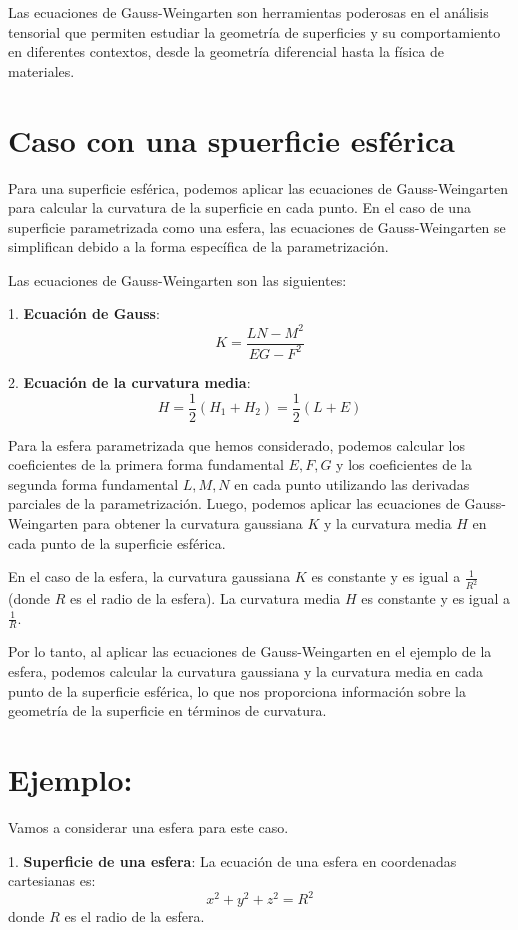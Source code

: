 \documentclass{article}
\begin{document}
	Las ecuaciones de Gauss-Weingarten son herramientas poderosas en el análisis tensorial que permiten estudiar la geometría de superficies y su comportamiento en diferentes contextos, desde la geometría diferencial hasta la física de materiales.
	
	\section{Caso con una spuerficie esférica}
	
	Para una superficie esférica, podemos aplicar las ecuaciones de Gauss-Weingarten para calcular la curvatura de la superficie en cada punto. En el caso de una superficie parametrizada como una esfera, las ecuaciones de Gauss-Weingarten se simplifican debido a la forma específica de la parametrización.
	
	Las ecuaciones de Gauss-Weingarten son las siguientes:
	
	1. \textbf{Ecuación de Gauss}:
	$$ K = \frac{LN - M^2}{EG - F^2} $$
	
	2. \textbf{Ecuación de la curvatura media}:
	$$ H = \frac{1}{2}(H_1 + H_2) = \frac{1}{2}(L + E) $$
	
	Para la esfera parametrizada que hemos considerado, podemos calcular los coeficientes de la primera forma fundamental $ E, F, G $ y los coeficientes de la segunda forma fundamental $ L, M, N $ en cada punto utilizando las derivadas parciales de la parametrización. Luego, podemos aplicar las ecuaciones de Gauss-Weingarten para obtener la curvatura gaussiana $ K $ y la curvatura media $ H $ en cada punto de la superficie esférica.
	
	En el caso de la esfera, la curvatura gaussiana $ K $ es constante y es igual a $ \frac{1}{R^2} $ (donde $ R $ es el radio de la esfera). La curvatura media $ H $ es constante y es igual a $ \frac{1}{R} $.
	
	Por lo tanto, al aplicar las ecuaciones de Gauss-Weingarten en el ejemplo de la esfera, podemos calcular la curvatura gaussiana y la curvatura media en cada punto de la superficie esférica, lo que nos proporciona información sobre la geometría de la superficie en términos de curvatura.
	
	\section{Ejemplo:}
	
	Vamos a considerar una esfera para este caso.
	
	1. \textbf{Superficie de una esfera}:
	La ecuación de una esfera en coordenadas cartesianas es:
	$$ x^2 + y^2 + z^2 = R^2 $$
	donde $ R $ es el radio de la esfera.
	
\end{document}
